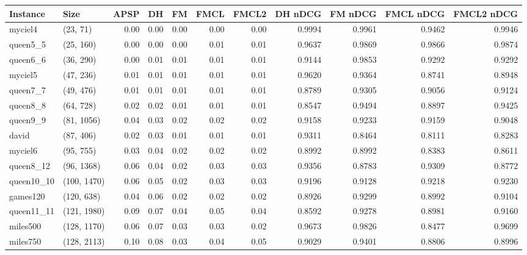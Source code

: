 \begin{tabular}{llrrrrrrrrr}
\toprule
  Instance &         Size &  APSP &   DH &   FM &  FMCL &  FMCL2 &  DH nDCG &  FM nDCG &  FMCL nDCG &  FMCL2 nDCG \\
\midrule
   myciel4 &     (23, 71) &  0.00 & 0.00 & 0.00 &  0.00 &   0.00 &   0.9994 &   0.9961 &     0.9462 &      0.9946 \\
  queen5\_5 &    (25, 160) &  0.00 & 0.00 & 0.00 &  0.01 &   0.01 &   0.9637 &   0.9869 &     0.9866 &      0.9874 \\
  queen6\_6 &    (36, 290) &  0.00 & 0.01 & 0.01 &  0.01 &   0.01 &   0.9144 &   0.9853 &     0.9292 &      0.9292 \\
   myciel5 &    (47, 236) &  0.01 & 0.01 & 0.01 &  0.01 &   0.01 &   0.9620 &   0.9364 &     0.8741 &      0.8948 \\
  queen7\_7 &    (49, 476) &  0.01 & 0.01 & 0.01 &  0.01 &   0.01 &   0.8789 &   0.9305 &     0.9056 &      0.9124 \\
  queen8\_8 &    (64, 728) &  0.02 & 0.02 & 0.01 &  0.01 &   0.01 &   0.8547 &   0.9494 &     0.8897 &      0.9425 \\
  queen9\_9 &   (81, 1056) &  0.04 & 0.03 & 0.02 &  0.02 &   0.02 &   0.9158 &   0.9233 &     0.9159 &      0.9048 \\
     david &    (87, 406) &  0.02 & 0.03 & 0.01 &  0.01 &   0.01 &   0.9311 &   0.8464 &     0.8111 &      0.8283 \\
   myciel6 &    (95, 755) &  0.03 & 0.04 & 0.02 &  0.02 &   0.02 &   0.8992 &   0.8992 &     0.8383 &      0.8611 \\
 queen8\_12 &   (96, 1368) &  0.06 & 0.04 & 0.02 &  0.03 &   0.03 &   0.9356 &   0.8783 &     0.9309 &      0.8772 \\
queen10\_10 &  (100, 1470) &  0.06 & 0.05 & 0.02 &  0.03 &   0.03 &   0.9196 &   0.9128 &     0.9218 &      0.9230 \\
  games120 &   (120, 638) &  0.04 & 0.06 & 0.02 &  0.02 &   0.02 &   0.8926 &   0.9299 &     0.8992 &      0.9104 \\
queen11\_11 &  (121, 1980) &  0.09 & 0.07 & 0.04 &  0.05 &   0.04 &   0.8592 &   0.9278 &     0.8981 &      0.9160 \\
  miles500 &  (128, 1170) &  0.06 & 0.07 & 0.03 &  0.03 &   0.02 &   0.9673 &   0.9826 &     0.8477 &      0.9699 \\
  miles750 &  (128, 2113) &  0.10 & 0.08 & 0.03 &  0.04 &   0.05 &   0.9029 &   0.9401 &     0.8806 &      0.8996 \\

\end{tabular}
